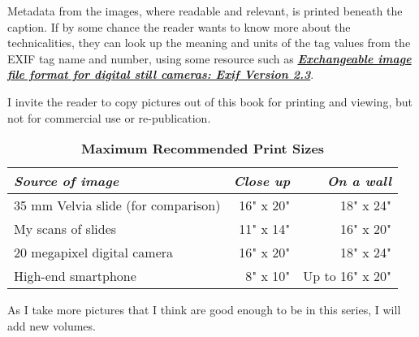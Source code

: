 Metadata from the images, where readable and relevant, is printed beneath the caption. If by some chance the reader wants to know more about the technicalities, they can look up the meaning and units of the tag values from the EXIF tag name and number, using some resource such as \href{https://www.cipa.jp/std/documents/e/DC-008-2012_E.pdf}{\emph{\textbf{Exchangeable image file format for digital still cameras: Exif Version 2.3}}}.

I invite the reader to copy pictures out of this book for printing and viewing, but not for commercial use or re-publication. 

\begin{table}[h]
\centering
\captionsetup{labelformat=empty}
\caption{\textbf{Maximum Recommended Print Sizes}}
\begin{tabular}{lrr}
\hline
\emph{Source of image}                                  & \emph{Close up} & \emph{On a wall} \\
\hline
35 mm Velvia slide (for comparison) & 16" x 20" & 18" x 24" \\
My scans of slides                            & 11" x 14"  & 16" x 20"  \\
20 megapixel digital camera             & 16" x 20"  & 18" x 24"  \\
High-end smartphone                      & 8" x 10"   & Up to 16" x 20"  \\
\hline
\end{tabular}
\end{table}

As I take more pictures that I think are good enough to be in this series, I will add new volumes.
